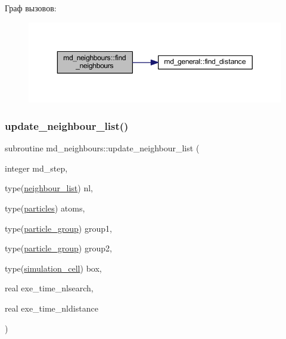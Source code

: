 Граф вызовов\+:\nopagebreak
\begin{figure}[H]
\begin{center}
\leavevmode
\includegraphics[width=350pt]{namespacemd__neighbours_a037f048abc67c7d83799c76aabaa8dac_cgraph}
\end{center}
\end{figure}
\mbox{\label{namespacemd__neighbours_aa3afc442e82c37b20e8963af79455747}} 
\subsubsection{\texorpdfstring{update\+\_\+neighbour\+\_\+list()}{update\_neighbour\_list()}}
{\footnotesize\ttfamily subroutine md\+\_\+neighbours\+::update\+\_\+neighbour\+\_\+list (\begin{DoxyParamCaption}\item[{integer}]{md\+\_\+step,  }\item[{type(\mbox{\hyperlink{structmd__general_1_1neighbour__list}{neighbour\+\_\+list}})}]{nl,  }\item[{type(\mbox{\hyperlink{structmd__general_1_1particles}{particles}})}]{atoms,  }\item[{type(\mbox{\hyperlink{structmd__general_1_1particle__group}{particle\+\_\+group}})}]{group1,  }\item[{type(\mbox{\hyperlink{structmd__general_1_1particle__group}{particle\+\_\+group}})}]{group2,  }\item[{type(\mbox{\hyperlink{structmd__general_1_1simulation__cell}{simulation\+\_\+cell}})}]{box,  }\item[{real}]{exe\+\_\+time\+\_\+nlsearch,  }\item[{real}]{exe\+\_\+time\+\_\+nldistance }\end{DoxyParamCaption})}



